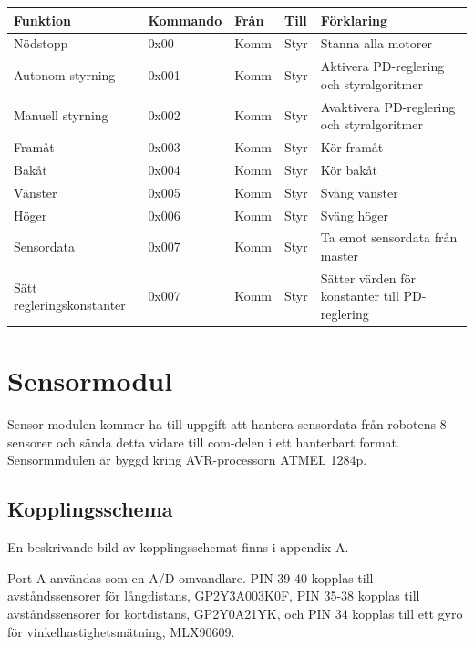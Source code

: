 \documentclass[a4paper,12pt,fleqn]{article}
\begin{document}
\begin{tabular}{| p{} | p{} | p{} | p{} | p{} |}
	\hline
	\rowcolor{listinggray}
	\textbf{Funktion} & \textbf{Kommando} & \textbf{Från} & \textbf{Till} & \textbf{Förklaring} \\ \hline
	Nödstopp & 0x00 & Komm & Styr & Stanna alla motorer \\ \hline
	Autonom styrning & 0x001 & Komm & Styr & Aktivera PD-reglering och styralgoritmer \\ \hline
	Manuell styrning & 0x002 & Komm & Styr & Avaktivera PD-reglering och styralgoritmer \\ \hline
	Framåt & 0x003 & Komm & Styr & Kör framåt \\ \hline
	Bakåt & 0x004 & Komm & Styr & Kör bakåt \\ \hline
	Vänster & 0x005 & Komm & Styr & Sväng vänster \\ \hline
	Höger & 0x006 & Komm & Styr & Sväng höger \\ \hline
	Sensordata & 0x007 & Komm & Styr & Ta emot sensordata från master \\ \hline
	Sätt regleringskonstanter & 0x007 & Komm & Styr & Sätter värden för konstanter till PD-reglering \\ \hline
\end{tabular}

\newpage



\section{Sensormodul}
Sensor modulen kommer ha till uppgift att hantera sensordata från robotens 8 sensorer och sända detta vidare till com-delen i ett hanterbart format. Sensormmdulen är byggd kring AVR-processorn ATMEL 1284p.

\subsection{Kopplingsschema}

En beskrivande bild av kopplingsschemat finns i appendix A.

Port A användas som en A/D-omvandlare. PIN 39-40 kopplas till avståndssensorer för långdistans, GP2Y3A003K0F, PIN 35-38 kopplas till avståndssensorer för kortdistans, GP2Y0A21YK, och PIN 34 kopplas till ett gyro för vinkelhastighetsmätning, MLX90609.
\end{document}
